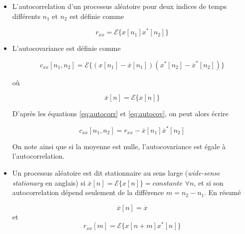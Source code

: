 \documentclass{article}
\begin{document}
\begin{itemize}\renewcommand{\labelitemi}{$\bullet$}

\item L'autocorrelation d'un processus aléatoire pour deux indices de temps différents \(n_1\) et \(n_2\) est définie comme

\begin{equation}
%
    \label{eq:autocorr} 
    r_{xx} = \mathcal E \{ x[n_1]x^*[n_2] \}
%
\end{equation}

\vspace*{15pt}

\item L'autocovariance est définie comme

\begin{equation}
%
    \label{eq:autocov} 
    c_{xx}[n_1,n_2] = \mathcal E \{(x[n_1]-\overline{x}[n_1])(x^*[n_2]-\overline{x}^*[n_2])\}
%
\end{equation}

où 

\begin{equation}
    \label{eq:mean} 
    \overline{x}[n] = \mathcal E \{x[n]\}
\end{equation}

D'après les équations \ref{eq:autocorr} et \ref{eq:autocov}, on peut alors écrire 

\begin{equation}
%
    \label{eq:autocovcorr} 
    c_{xx}[n_1,n_2] = r_{xx}-\overline{x}[n_1]\overline{x}^*[n_2]
%
\end{equation}

On note ainsi que si la moyenne est nulle, l'autocovariance est égale à l'autocorrelation.
\vspace*{20pt}

\item Un processus aléatoire est dit stationnaire au sens large (\textit{wide-sense stationary} en anglais) si \(\overline{x}[n] = \mathcal E\{x[n]\} = constante\) \( \forall n\), et si son autocorrelation dépend seulement de la différence  \(m = n_2 - n_1 \). En résumé

\[\overline{x}[n] = \overline{x}\] et
\begin{equation}
        \label{eq:autocorrwss} 
    r_{xx}[m] = \mathcal E \{ x[n + m]x^*[n] \}
\end{equation}

\vspace*{15pt}


\end{itemize}
\end{document}
